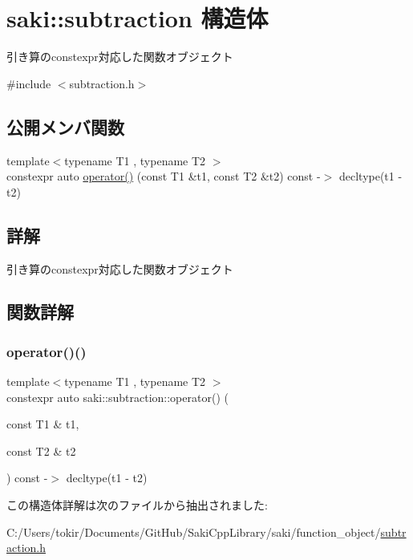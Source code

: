 \hypertarget{structsaki_1_1subtraction}{}\section{saki\+:\+:subtraction 構造体}
\label{structsaki_1_1subtraction}


引き算のconstexpr対応した関数オブジェクト  




{\ttfamily \#include $<$subtraction.\+h$>$}

\subsection*{公開メンバ関数}
\begin{DoxyCompactItemize}
\item 
{\footnotesize template$<$typename T1 , typename T2 $>$ }\\constexpr auto \mbox{\hyperlink{structsaki_1_1subtraction_a5de4626c125df92e70848fcac27eef74}{operator()}} (const T1 \&t1, const T2 \&t2) const -\/$>$ decltype(t1 -\/ t2)
\end{DoxyCompactItemize}


\subsection{詳解}
引き算のconstexpr対応した関数オブジェクト 

\subsection{関数詳解}
\mbox{\label{structsaki_1_1subtraction_a5de4626c125df92e70848fcac27eef74}} 
\subsubsection{\texorpdfstring{operator()()}{operator()()}}
{\footnotesize\ttfamily template$<$typename T1 , typename T2 $>$ \\
constexpr auto saki\+::subtraction\+::operator() (\begin{DoxyParamCaption}\item[{const T1 \&}]{t1,  }\item[{const T2 \&}]{t2 }\end{DoxyParamCaption}) const -\/$>$ decltype(t1 -\/ t2)
		\hspace{0.3cm}{\ttfamily [inline]}}



この構造体詳解は次のファイルから抽出されました\+:\begin{DoxyCompactItemize}
\item 
C\+:/\+Users/tokir/\+Documents/\+Git\+Hub/\+Saki\+Cpp\+Library/saki/function\+\_\+object/\mbox{\hyperlink{subtraction_8h}{subtraction.\+h}}\end{DoxyCompactItemize}
